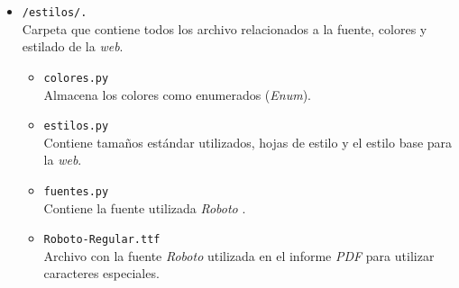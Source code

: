 \begin{itemize}
\begin{itemize}
\begin{itemize}
					\item \texttt{seleccion.py}\\Fichero que almacena todos los componentes visuales del menú desplegable de indicadores. Además controla la llamada a cada uno de los método una vez seleccionado la opción deseada.
					\item \texttt{tabla.py}\\Registro que contiene todos los componentes para la creación de tablas. En un inicio se encontraba en el archivo \texttt{vent\_flotante.py} separándose por limpieza.
				\end{itemize}
			
			\item \texttt{/estilos/.}\\Carpeta que contiene todos los archivo relacionados a la fuente, colores y estilado de la \textit{web}.
				\begin{itemize}
					\item \texttt{colores.py}\\Almacena los colores como enumerados (\textit{Enum}).
					\item \texttt{estilos.py}\\Contiene tamaños estándar utilizados, hojas de estilo \cite{roboto_estilo} \cite{bootstrap} y el estilo base para la \textit{web}.
					\item \texttt{fuentes.py}\\Contiene la fuente utilizada \textit{Roboto} \cite{roboto}.
					
					\item \texttt{Roboto-Regular.ttf}\\Archivo con la fuente \textit{Roboto} utilizada en el informe \textit{PDF} para utilizar caracteres especiales.
				\end{itemize}
				

\end{itemize}
\end{itemize}
